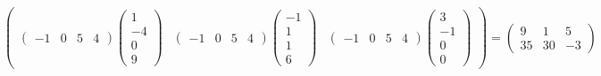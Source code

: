 \documentclass[11pt]{article}
\theoremstyle{definition}
\theoremstyle{remark}
\begin{document}
\begin{itemize}
$$\begin{pmatrix}
\begin{pmatrix}
-1&0&5&4
\end{pmatrix}\begin{pmatrix}
1 \\
-4 \\
0 \\
9
\end{pmatrix}&
\begin{pmatrix} 
-1&0&5&4
\end{pmatrix}\begin{pmatrix}
-1 \\
1 \\
1 \\
6
\end{pmatrix}&
\begin{pmatrix} 
-1&0&5&4
\end{pmatrix}\begin{pmatrix}
3 \\
-1 \\
0 \\
0
\end{pmatrix}
\end{pmatrix}
=
\begin{pmatrix}
9&1&5 \\
35&30&-3
\end{pmatrix}
$$
\end{itemize}
\end{document}
